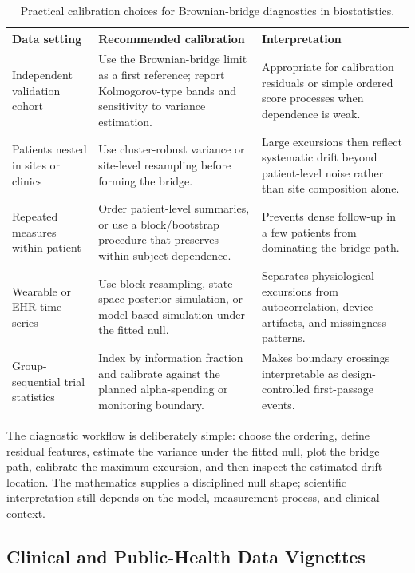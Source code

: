 \documentclass{article}
\theoremstyle{plain}
\theoremstyle{definition}
\begin{document}
\begin{table}[H]
\centering
\small
\caption{Practical calibration choices for Brownian-bridge diagnostics in biostatistics.}
\label{tab:bridge-calibration}
\begin{tabularx}{\textwidth}{>{\RaggedRight\arraybackslash}p{}>{\RaggedRight\arraybackslash}p{}>{\RaggedRight\arraybackslash}X}
\toprule
Data setting & Recommended calibration & Interpretation \\
\midrule
Independent validation cohort &
Use the Brownian-bridge limit as a first reference; report Kolmogorov-type bands and sensitivity to variance estimation. &
Appropriate for calibration residuals or simple ordered score processes when dependence is weak. \\
Patients nested in sites or clinics &
Use cluster-robust variance or site-level resampling before forming the bridge. &
Large excursions then reflect systematic drift beyond patient-level noise rather than site composition alone. \\
Repeated measures within patient &
Order patient-level summaries, or use a block/bootstrap procedure that preserves within-subject dependence. &
Prevents dense follow-up in a few patients from dominating the bridge path. \\
Wearable or EHR time series &
Use block resampling, state-space posterior simulation, or model-based simulation under the fitted null. &
Separates physiological excursions from autocorrelation, device artifacts, and missingness patterns. \\
Group-sequential trial statistics &
Index by information fraction and calibrate against the planned alpha-spending or monitoring boundary. &
Makes boundary crossings interpretable as design-controlled first-passage events. \\
\bottomrule
\end{tabularx}
\end{table}

The diagnostic workflow is deliberately simple: choose the ordering,
define residual features, estimate the variance under the fitted null,
plot the bridge path, calibrate the maximum excursion, and then inspect the
estimated drift location. The mathematics supplies a disciplined null
shape; scientific interpretation still depends on the model, measurement
process, and clinical context.

\subsection{Clinical and Public-Health Data Vignettes}
\end{document}
